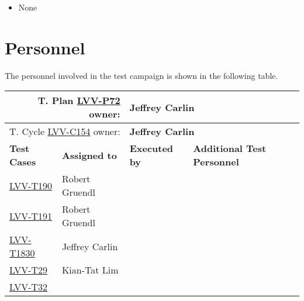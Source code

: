 \documentclass[DM,lsstdraft,STR,toc]{lsstdoc}
\begin{document}
\begin{itemize}
\item None
\end{itemize}


\newpage
\section{Personnel}
\label{sect:personnel}

The personnel involved in the test campaign is shown in the following table.

{\small
\begin{longtable}{p{3cm}p{3cm}p{3cm}p{6cm}}
\hline
\multicolumn{2}{r}{T. Plan \href{https://jira.lsstcorp.org/secure/Tests.jspa\#/testPlan/LVV-P72}{LVV-P72} owner:} &
\multicolumn{2}{l}{\textbf{ Jeffrey Carlin } }\\\hline
\multicolumn{2}{r}{T. Cycle \href{https://jira.lsstcorp.org/secure/Tests.jspa\#/testCycle/LVV-C154}{LVV-C154} owner:} &
\multicolumn{2}{l}{\textbf{
Jeffrey Carlin }
} \\\hline
\textbf{Test Cases} & \textbf{Assigned to} & \textbf{Executed by} & \textbf{Additional Test Personnel} \\ \hline
\href{https://jira.lsstcorp.org/secure/Tests.jspa#/testCase/LVV-T190}{LVV-T190}
& {\small Robert Gruendl } & {\small  } &
\begin{minipage}[]{6cm}
\smallskip
{\small  }
\medskip
\end{minipage}
\\ \hline
\href{https://jira.lsstcorp.org/secure/Tests.jspa#/testCase/LVV-T191}{LVV-T191}
& {\small Robert Gruendl } & {\small  } &
\begin{minipage}[]{6cm}
\smallskip
{\small  }
\medskip
\end{minipage}
\\ \hline
\href{https://jira.lsstcorp.org/secure/Tests.jspa#/testCase/LVV-T1830}{LVV-T1830}
& {\small Jeffrey Carlin } & {\small  } &
\begin{minipage}[]{6cm}
\smallskip
{\small  }
\medskip
\end{minipage}
\\ \hline
\href{https://jira.lsstcorp.org/secure/Tests.jspa#/testCase/LVV-T29}{LVV-T29}
& {\small Kian-Tat Lim } & {\small  } &
\begin{minipage}[]{6cm}
\smallskip
{\small  }
\medskip
\end{minipage}
\\ \hline
\href{https://jira.lsstcorp.org/secure/Tests.jspa#/testCase/LVV-T32}{LVV-T32}

\end{longtable}}
\end{document}
